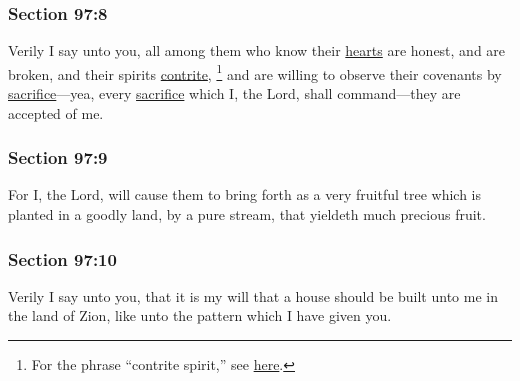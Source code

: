 	\subsubsection{Section 97:8} %
		\label{DC97-8}

		Verily I say unto you, all among them who know their \hyperref[HEART]{hearts} are honest, and are broken, and their spirits \hyperref[CONTRITE]{contrite},%
			\footnote{%
				For the phrase ``contrite spirit,'' see \hyperref[SPIRIT-PHRASES]{here}.
				}
		and are willing to observe their covenants by \hyperref[SACRIFICE]{sacrifice}---yea, every \hyperref[SACRIFICE]{sacrifice} which I, the Lord, shall command---they are accepted of me.


	\subsubsection{Section 97:9} %
		\label{DC97-9}

		For I, the Lord, will cause them to bring forth as a very fruitful tree which is planted in a goodly land, by a pure stream, that yieldeth much precious fruit.


	\subsubsection{Section 97:10} %
		\label{DC97-10}

		Verily I say unto you, that it is my will that a house should be built unto me in the land of Zion, like unto the pattern which I have given you.

